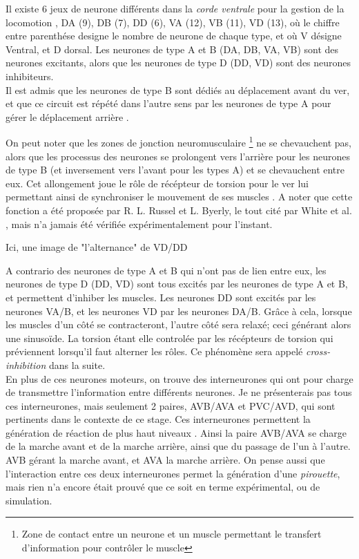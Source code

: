 Il existe 6 jeux de neurone différents dans la \textit{corde ventrale} pour la
gestion de la locomotion \cite{Boyle2009}, DA (9), DB (7), DD (6), VA (12), VB
(11), VD (13), où le chiffre entre parenthése designe le nombre de neurone de
chaque type, et où V désigne Ventral, et D dorsal.  Les neurones de type A et B
(DA, DB, VA, VB) sont des neurones excitants, alors que les neurones de type D
(DD, VD) sont des neurones inhibiteurs.\\


Il est admis que les neurones de type B sont dédiés au déplacement avant du ver,
et que ce circuit est répété dans l'autre sens par les neurones de type A
pour gérer le déplacement arrière \cite{AltunZ.F.andHall2011,Boyle2009,White1986}.

On peut noter que les zones de jonction neuromusculaire \footnote{Zone de
contact entre un neurone et un muscle permettant le transfert d'information 
pour contrôler le muscle} ne se chevauchent pas, alors que les processus
des neurones se prolongent vers l'arrière pour les neurones de type B (et
inversement vers l'avant pour les types A) et se chevauchent entre eux. Cet
allongement joue le rôle de récépteur de torsion pour le ver lui permettant
ainsi de synchroniser le mouvement de ses muscles \cite{Boyle2009}. A noter que
cette fonction a été proposée par R. L. Russel et L. Byerly, le tout cité par
White et al. \cite{White1986}, mais n'a jamais été vérifiée expérimentalement
pour l'instant.


\begin{center}
   Ici, une image de "l'alternance" de VD/DD
\end{center}
A contrario des neurones de type A et B qui n'ont pas de lien entre eux, les
neurones de type D (DD, VD) sont tous excités par les neurones de type A et B, 
et permettent d'inhiber les muscles. Les neurones DD sont excités par les neurones VA/B,
et les neurones VD par les neurones DA/B. Grâce à cela, lorsque les muscles d'un côté se 
contracteront, l'autre côté sera relaxé; ceci générant alors une
sinusoïde. La torsion étant elle controlée par les récépteurs de torsion qui
préviennent lorsqu'il faut alterner les rôles. Ce phénomène sera appelé
\textit{cross-inhibition} dans la suite.\\


En plus de ces neurones moteurs, on trouve des interneurones qui ont pour
charge de transmettre l'information entre différents neurones. Je ne
présenterais pas tous ces interneurones, mais seulement 2 paires, AVB/AVA et
PVC/AVD, qui sont pertinents dans le contexte de ce stage. Ces interneurones
permettent la génération de réaction de plus haut niveaux
\cite{Boyle2009,White1986}.  Ainsi la paire AVB/AVA se charge de la marche
avant et de la marche arrière, ainsi que du passage de l'un à l'autre. AVB gérant
la marche avant, et AVA la marche arrière. On pense aussi que l'interaction
entre ces deux interneurones permet la génération d'une \textit{pirouette},
mais rien n'a encore était prouvé que ce soit en terme expérimental, ou de
simulation.

